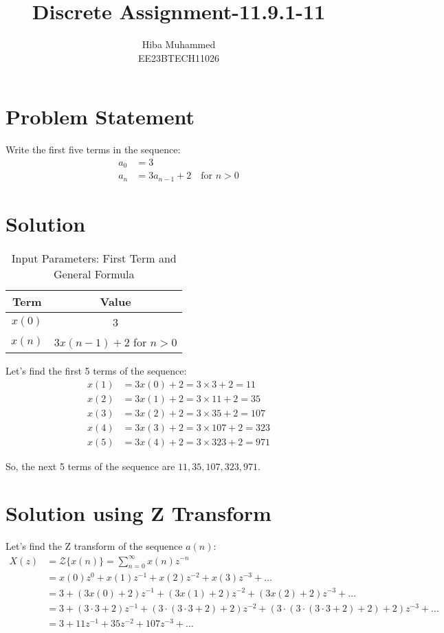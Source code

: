 \documentclass[12pt]{article}
\begin{document}
\title{Discrete Assignment-11.9.1-11}
\author{Hiba Muhammed \\
        EE23BTECH11026}
\maketitle

\section*{Problem Statement}
Write the first five terms in the sequence:
\[
\begin{aligned}
a_{0}  &= 3 \\
a_{n}  &= 3a_{n-1} + 2 \quad \text{for } n > 0
\end{aligned}
\]

\section*{Solution}
\begin{table}[h]
  \centering
  \caption{Input Parameters: First Term and General Formula}
  \begin{tabular}{|c|c|}
    \hline
    \textbf{Term} & \textbf{Value} \\
    \hline
    \(x(0) \) & 3 \\
    \(x(n)\) & \(3x(n-1) + 2\) for \(n > 0\) \\
    \hline
  \end{tabular}
\end{table}
Let's find the first 5 terms of the sequence:
\begin{align}
x(1) &= 3x(0)  + 2 = 3 \times 3 + 2 = 11 \\
x(2) &= 3x(1) + 2 = 3 \times 11 + 2 = 35 \\
x(3) &= 3x(2) + 2 = 3 \times 35 + 2 = 107 \\
x(4) &= 3x(3) + 2 = 3 \times 107 + 2 = 323 \\
x(5) &= 3x(4) + 2 = 3 \times 323 + 2 = 971 
\end{align}

So, the next 5 terms of the sequence are \(11, 35, 107, 323, 971\).



\section*{Solution using Z Transform}
Let's find the Z transform of the sequence \(a(n)\):
\begin{align*}
X(z) &= \mathcal{Z}\{x(n)\} = \sum_{n=0}^{\infty} x(n)z^{-n} \\
&= x(0)z^0 + x(1)z^{-1} + x(2)z^{-2} + x(3)z^{-3} + \ldots \\
&= 3 + (3x(0) + 2)z^{-1} + (3x(1) + 2)z^{-2} + (3x(2) + 2)z^{-3} + \ldots \\
&= 3 + (3 \cdot 3 + 2)z^{-1} + (3 \cdot (3 \cdot 3 + 2) + 2)z^{-2} + (3 \cdot (3 \cdot (3 \cdot 3 + 2) + 2) + 2)z^{-3} + \ldots \\
&= 3 + 11z^{-1} + 35z^{-2} + 107z^{-3} + \ldots
\end{align*}
\end{document}

